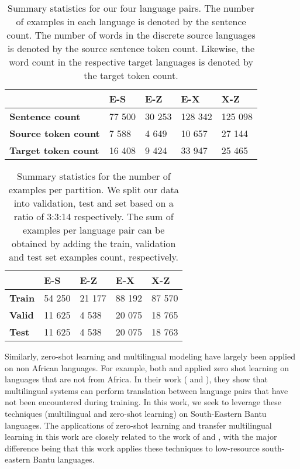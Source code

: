 \documentclass[11pt,a4paper]{article}
\begin{document}
\begin{table*}[!htb]
\centering
\begin{tabular}{lllll}
\hline
& \textbf{E-S}& \textbf{E-Z} & \textbf{E-X} &  \textbf{X-Z} \\
\hline
\textbf{Sentence count} & 77 500 & 30 253 & 128 342 & 125 098 \\ 
\textbf{Source token count} & 7 588 & 4 649 & 10 657 & 27 144 \\ 
\textbf{Target token count} & 16 408 & 9 424 & 33 947 & 25 465 \\ 
\hline
\end{tabular}
\caption{\label{tab: data_stats}
Summary statistics for our four language pairs. The number of examples in each language is denoted by the sentence count. The number of words in the discrete source languages is denoted by the source sentence token count. Likewise, the word count in the respective target languages is denoted by the target token count.}
\end{table*}

\begin{table}[!htb]
\centering
\begin{tabular}{lllll}
\hline & \textbf{E-S}& \textbf{E-Z} & \textbf{E-X} &  \textbf{X-Z} \\
\hline
\textbf{Train} & 54 250 & 21 177 & 88 192 & 87 570 \\ 
\textbf{Valid} & 11 625 & 4 538 & 20 075 &  18 765 \\ 
 \textbf{Test} & 11 625 & 4 538 & 20 075 & 18 763 \\ 
\hline
\end{tabular}
\caption{\label{tab: data_split} Summary statistics for the number of examples per partition. We split our data into validation, test and set based on a ratio of 3:3:14 respectively. The sum of examples per language pair can be obtained by adding the train, validation and test set examples count, respectively.}
\end{table}
\indent Similarly, zero-shot learning and multilingual modeling have largely been applied on non African languages. For example, both \citet{johnson2017google} and \citet{ha2017effective} applied zero shot learning on languages that are not from Africa. In their work (\citet{johnson2017google} and \citet{ha2017effective}), they show that multilingual systems can perform translation between language pairs that have not been encountered during training. In this work, we seek to leverage these techniques (multilingual and zero-shot learning) on South-Eastern Bantu languages. The applications of zero-shot learning and transfer multilingual learning in this work are closely related to the work of  \citet{lakew2018multilingual} and \citet{johnson2017google}, with the major difference being that this work applies these techniques to low-resource south-eastern Bantu languages.  
\end{document}
